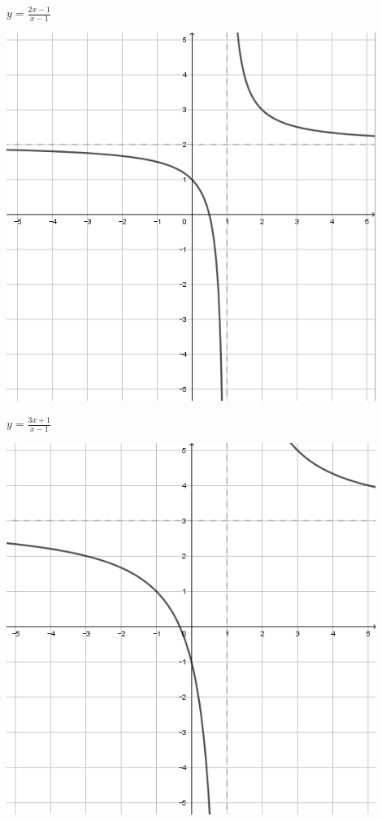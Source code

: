 \documentclass[a4paper]{oblivoir}
\begin{document}
\begin{minipage}{0.45\textwidth}\centering
\(y=\frac{2x-1}{x-1}\)
\par\bigskip\includegraphics[width=0.9\textwidth]{img/21-3}
\end{minipage}
\begin{minipage}{0.45\textwidth}\centering
\(y=\frac{3x+1}{x-1}\)
\par\bigskip\includegraphics[width=0.9\textwidth]{img/21-4}
\end{minipage}\bigskip\bigskip\par
\end{document}
